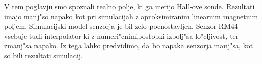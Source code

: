 %
%
%
%
%
%

V tem poglavju smo spoznali realno polje, ki ga merijo Hall-ove sonde. Rezultati imajo manj"so napako kot pri simulacijah z aproksimiranim linearnim magnetnim poljem.  Simulacijski model senzorja je bil zelo poenostavljen. Senzor RM44 vsebuje tudi interpolator ki z numeri"cnimipostopki izbolj"sa lo"cljivost, ter zmanj"sa napako. Iz tega lahko predvidimo, da bo napaka senzorja manj"sa, kot so bili rezultati simulacij.

